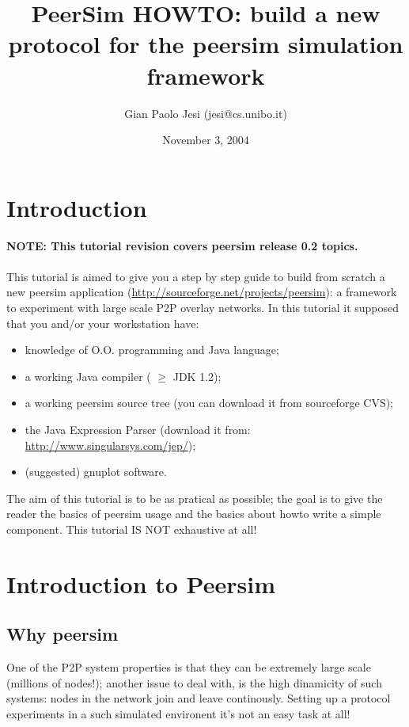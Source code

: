 \documentclass[a4paper,12pt]{article}
\title{PeerSim HOWTO: build a new protocol for the peersim simulation
framework}
\author{Gian Paolo Jesi (jesi@cs.unibo.it)}
\date{November 3, 2004}
\begin{document}
\maketitle



\section{Introduction}

\textbf{NOTE: This tutorial revision covers peersim release 0.2 topics.}\\
\\
This tutorial is aimed to give you a step by step guide to build from
scratch a new peersim application (\url{http://sourceforge.net/projects/peersim}):
a framework to experiment with large scale P2P overlay networks. In
this tutorial it supposed that you and/or your workstation have: 

\begin{itemize}
\item knowledge of O.O. programming and Java language;
\item a working Java compiler ( $\geq$ JDK 1.2);
\item a working peersim source tree (you can download it from sourceforge
CVS);
\item the Java Expression Parser (download it from: \url{http://www.singularsys.com/jep/});
\item (suggested) gnuplot software. 
\end{itemize}

The aim of this tutorial is to be
as pratical as possible; the goal is to give the reader the basics
of peersim usage and the basics about howto write a simple component.
This tutorial IS NOT exhaustive at all! 


\section{Introduction to Peersim}


\subsection{Why peersim}

One of the P2P system properties is that they can be extremely large
scale (millions of nodes!); another issue to deal with, is the high
dinamicity of such systems: nodes in the network join and leave continously.
Setting up a protocol experiments in a such simulated environent it's
not an easy task at all! 
\end{document}
